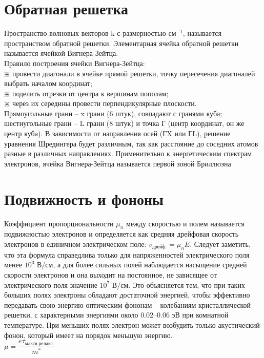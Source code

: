 \begin{multicols*}{2}
		\section{Обратная решетка}
		Пространство волновых векторов k с размерностью $\text{см}^{-1}$, называется пространством обратной решетки. Элементарная ячейка обратной решетки называется ячейкой Вигнера-Зейтца.\\
		Правило построения ячейки Вигнера-Зейтца:\\
		$\divideontimes$ провести диагонали в ячейке прямой решетки, точку пересечения диагоналей выбрать началом координат;\\
		$\divideontimes$ поделить отрезки от центра к вершинам пополам;\\
		$\divideontimes$ через их середины провести перпендикулярные плоскости.\\
		Прямоугольные грани – x грани (6 штук), совпадают с гранями куба; шестиугольные грани – L грани (8 штук) и точка Г (центр координат, он же центр куба). В зависимости от направления осей (ГX или ГL), решение уравнения Шредингера будет различным, так как расстояние до соседних атомов разные в различных направлениях. Применительно к энергетическим спектрам электронов, ячейка Вигнера-Зейтца называется первой зоной Бриллюэна

		\section{Подвижность и фононы}
		Коэффициент пропорциональности $\mu_n$ между скоростью и полем называется подвижностью электронов и определяется как средняя дрейфовая скорость электронов в единичном электрическом поле: $v_\text{дрейф.} = \mu_n E$. Следует заметить, что эта формула справедлива только для напряженностей электрического поля менее $10^3$ В/см, а для более сильных полей наблюдается насыщение средней скорости электронов и она выходит на постоянное, не зависящее от электрического поля значение $10^7$ В/см. Это объясняется тем, что при таких больших полях электроны обладают достаточной энергией, чтобы эффективно передавать свою энергию оптическим фононам – колебаниям кристаллической решетки, с характерными энергиями около $0.02–0.06$ эВ при комнатной температуре. При меньших полях электрон может возбудить только акустический фонон, который имеет на порядок меньшую энергию.\\
		$\mu = \dfrac{e \tau_\text{максв.релакс.}}{m^*}$


\end{multicols*}
